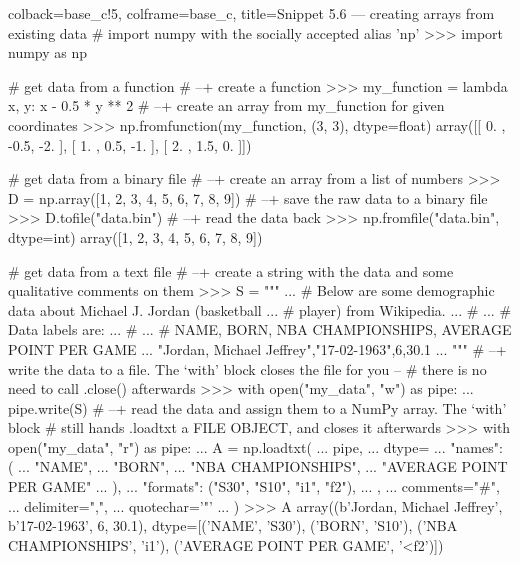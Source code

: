 \documentclass[a4paper,11pt]{book}
\begin{document}
\begin{pythoncode}[linenos=true,]{colback=base_c!5, colframe=base_c, title=\sffamily Snippet 5.6 --- creating arrays from existing data}
# import numpy with the socially accepted alias 'np'
>>> import numpy as np

# get data from a function
# --+ create a function
>>> my_function = lambda x, y: x - 0.5 * y ** 2
# --+ create an array from my_function for given coordinates
>>> np.fromfunction(my_function, (3, 3), dtype=float)
array([[ 0. , -0.5, -2. ],
       [ 1. ,  0.5, -1. ],
       [ 2. ,  1.5,  0. ]])

# get data from a binary file
# --+ create an array from a list of numbers
>>> D = np.array([1, 2, 3, 4, 5, 6, 7, 8, 9])
# --+ save the raw data to a binary file
>>> D.tofile("data.bin")
# --+ read the data back
>>> np.fromfile("data.bin", dtype=int)
array([1, 2, 3, 4, 5, 6, 7, 8, 9])

# get data from a text file
# --+ create a string with the data and some qualitative comments on them
>>> S = """
... # Below are some demographic data about Michael J. Jordan (basketball
... # player) from Wikipedia.
... #
... # Data labels are:
... #
... # NAME, BORN, NBA CHAMPIONSHIPS, AVERAGE POINT PER GAME
... "Jordan, Michael Jeffrey","17-02-1963",6,30.1
... """
# --+ write the data to a file. The `with' block closes the file for you --
#     there is no need to call .close() afterwards
>>> with open("my_data", "w") as pipe:
...     pipe.write(S)
# --+ read the data and assign them to a NumPy array. The `with' block
#     still hands .loadtxt a FILE OBJECT, and closes it afterwards
>>> with open("my_data", "r") as pipe:
...     A = np.loadtxt(
...       pipe,
...       dtype={
...             "names": (
...                      "NAME",
...                      "BORN",
...                      "NBA CHAMPIONSHIPS",
...                      "AVERAGE POINT PER GAME"
...                    ),
...             "formats": ("S30", "S10", "i1", "f2"),
...             },
...       comments="#",
...       delimiter=",",
...       quotechar='"'
...     )
>>> A
array((b'Jordan, Michael Jeffrey', b'17-02-1963', 6, 30.1),
      dtype=[('NAME', 'S30'), ('BORN', 'S10'), ('NBA CHAMPIONSHIPS', 'i1'), ('AVERAGE POINT PER GAME', '<f2')])
\end{pythoncode}
\end{document}
